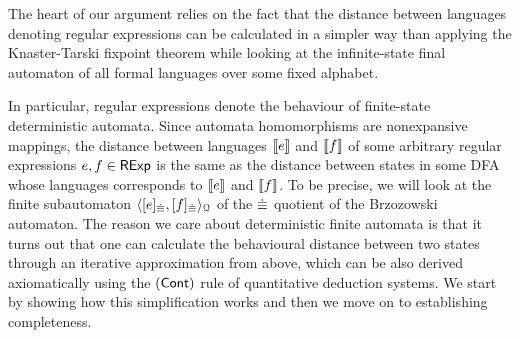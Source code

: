 The heart of our argument relies on the fact that the distance between languages denoting regular expressions can be calculated in a simpler way than applying the Knaster-Tarski fixpoint theorem while looking at the infinite-state final automaton of all formal languages over some fixed alphabet. 

In particular, regular expressions denote the behaviour of finite-state deterministic automata. Since automata homomorphisms are nonexpansive mappings, the distance between languages $\left\llbracket{e}\right\rrbracket$ and $\left\llbracket{f}\right\rrbracket$ of some arbitrary regular expressions $e, f \in \mathsf{RExp}$ is the same as the distance between states in some DFA whose languages corresponds to $\left\llbracket{e}\right\rrbracket$ and $\left\llbracket{f}\right\rrbracket$. To be precise, we will look at the finite subautomaton $\langle [e]_{{\mathrel{\dot\equiv}}}, [f]_{{\mathrel{\dot\equiv}}} \rangle_{\mathcal{Q}}$ of the ${\mathrel{\dot\equiv}}$ quotient of the Brzozowski automaton. The reason we care about deterministic finite automata is that it turns out that one can calculate the behavioural distance between two states through an iterative approximation from above, which can be also derived axiomatically using the $(\textsf{Cont})$ rule of quantitative deduction systems. We start by showing how this simplification works and then we move on to establishing completeness.
